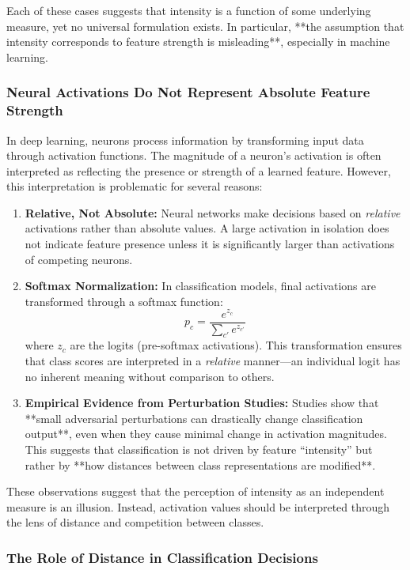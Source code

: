 \documentclass[12pt]{article}
\begin{document}
Each of these cases suggests that intensity is a function of some underlying measure, yet no universal formulation exists. In particular, **the assumption that intensity corresponds to feature strength is misleading**, especially in machine learning.

\subsubsection{Neural Activations Do Not Represent Absolute Feature Strength}

In deep learning, neurons process information by transforming input data through activation functions. The magnitude of a neuron’s activation is often interpreted as reflecting the presence or strength of a learned feature. However, this interpretation is problematic for several reasons:

\begin{enumerate}
    \item \textbf{Relative, Not Absolute:} Neural networks make decisions based on \textit{relative} activations rather than absolute values. A large activation in isolation does not indicate feature presence unless it is significantly larger than activations of competing neurons.
    \item \textbf{Softmax Normalization:} In classification models, final activations are transformed through a softmax function:
    \[
    p_c = \frac{e^{z_c}}{\sum_{c'} e^{z_{c'}}}
    \]
    where \( z_c \) are the logits (pre-softmax activations). This transformation ensures that class scores are interpreted in a \textit{relative} manner—an individual logit has no inherent meaning without comparison to others.
    \item \textbf{Empirical Evidence from Perturbation Studies:} Studies show that **small adversarial perturbations can drastically change classification output**, even when they cause minimal change in activation magnitudes. This suggests that classification is not driven by feature “intensity” but rather by **how distances between class representations are modified**.
\end{enumerate}

These observations suggest that the perception of intensity as an independent measure is an illusion. Instead, activation values should be interpreted through the lens of distance and competition between classes.

\subsubsection{The Role of Distance in Classification Decisions}
\end{document}

